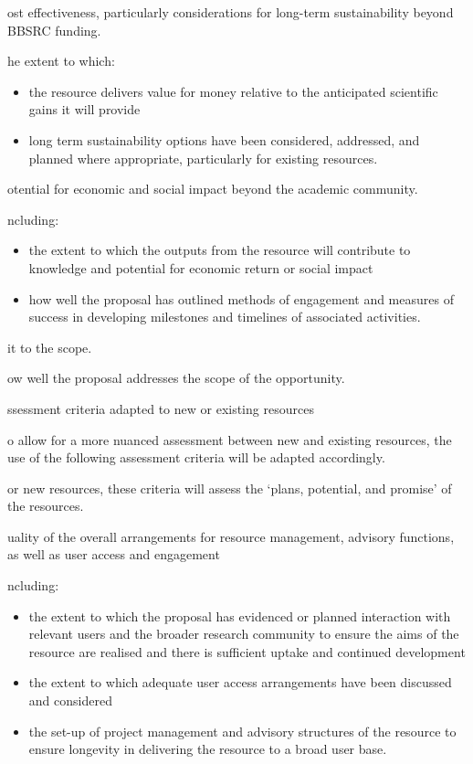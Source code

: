 \documentclass[a4paper,11point]{article}
\def\ii#1\par{{\color{blue!40}\sl #1}\par}
\def\iibf#1\par{{\color{blue!40}\sl\bfseries #1}\par}
\begin{document}
\iibf Cost effectiveness, particularly considerations for long-term
sustainability beyond BBSRC funding.

\ii The extent to which:
\begin{itemize}[nosep]
    \item the resource delivers value for money relative to the anticipated scientific gains it will provide
    \item long term sustainability options have been considered, addressed, and planned where appropriate, particularly for existing resources.
\end{itemize}

\iibf Potential for economic and social impact beyond the academic
community.

\ii Including:
\begin{itemize}
    \item the extent to which the outputs from the resource will contribute to knowledge and potential for economic return or social impact
    \item how well the proposal has outlined methods of engagement and measures of success in developing milestones and timelines of associated activities.
\end{itemize}

\iibf Fit to the scope.

\ii How well the proposal addresses the scope of the opportunity.

\iibf Assessment criteria adapted to new or existing resources

\ii To allow for a more nuanced assessment between new and existing
resources, the use of the following assessment criteria will be
adapted accordingly. 

\ii For new resources, these criteria will assess the ‘plans, potential, and promise’ of the resources.

\iibf Quality of the overall arrangements for resource management, advisory functions, as well as user access and engagement

\ii Including:
\begin{itemize}
    \item the extent to which the proposal has evidenced or planned interaction with relevant users and the broader research community to ensure the aims of the resource are realised and there is sufficient uptake and continued development
    \item the extent to which adequate user access arrangements have been discussed and considered
    \item the set-up of project management and advisory structures of the resource to ensure longevity in delivering the resource to a broad user base.
\end{itemize}
\end{document}
